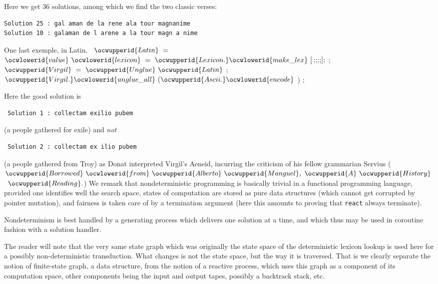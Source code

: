 \documentclass[12pt]{article}
\begin{document}
\ocwendcode{}\ocwindent{0.00em}
Here we get 36 solutions, among which we find the two classic verses:
\begin{verbatim}
Solution 25 : gal aman de la rene ala tour magnanime
Solution 10 : galaman de l arene a la tour magn a nime
\end{verbatim}

\ocweol
\ocwindent{0.00em}
One last exemple, in Latin. 
\ocweol
\label{../ML/unglue_test.ml:5538}%
\medskip
\ocwbegincode{}\ocwindent{0.00em}
~$\ocwupperid{Latin}~=~$\ocweol
\ocwindent{0.00em}
$\ocwlowerid{value}~\ocwlowerid{lexicon}~=~\ocwupperid{Lexicon.}\ocwlowerid{make\_lex}~[$;;;;$];$\ocweol
\ocwindent{0.00em}
\ocweol
\ocwindent{0.00em}
;\ocweol
\ocwindent{0.00em}
~$\ocwupperid{Virgil}~=~\ocwupperid{Unglue}~\ocwupperid{Latin}$\ocweol
\ocwindent{0.00em}
;\ocweol
\ocwindent{0.00em}
$\ocwupperid{Virgil.}\ocwlowerid{unglue\_all}~(\ocwupperid{Ascii.}\ocwlowerid{encode}~$$)$\ocweol
\ocwindent{0.00em}
;\medskip

\ocwendcode{}\ocwindent{0.00em}
Here the good solution is 
\begin{verbatim}
 Solution 1 : collectam exilio pubem
\end{verbatim}
(a people gathered for exile) and {\sl not}
\begin{verbatim}
 Solution 2 : collectam ex ilio pubem
\end{verbatim}
(a people gathered from Troy) as Donat interpreted Virgil's Aeneid,
incurring the criticism of his fellow grammarian Servius
(\ocwbegindcode{}$\ocwupperid{Borrowed}~\ocwlowerid{from}~\ocwupperid{Alberto}~\ocwupperid{Manguel},~\ocwupperid{A}~\ocwupperid{History}~$~$\ocwupperid{Reading}.$\ocwenddcode{}) 
\ocweol
We remark that nondeterministic programming is basically
trivial in a functional programming language, provided one identifies well
the search space, states of computation are stored as pure data structures
(which cannot get corrupted by pointer mutation),
and fairness is taken care of by a termination argument 
(here this amounts to proving that \verb:react: always terminate).

Nondeterminism is best handled by a generating process which delivers
one solution at a time, and which thus may be used in coroutine fashion with
a solution handler. 

The reader will note that the very same state graph which was originally the
state space of the deterministic lexicon lookup is used here for a possibly
non-deterministic transduction. What changes is not the state space, but
the way it is traversed. That is we clearly separate the notion of 
finite-state graph, a data structure, from the notion of a reactive process,
which uses this graph as a component of its computation space, other components
being the input and output tapes, possibly a backtrack stack, etc.
\end{document}
